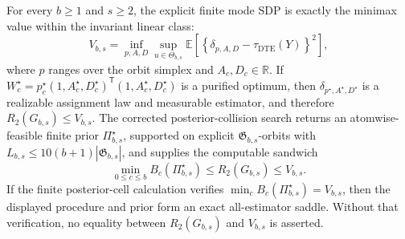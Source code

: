 For every \(b\ge1\) and \(s\ge2\), the explicit finite mode SDP is exactly the minimax value within the invariant linear class:
\[
V_{b,s}=
\inf_{p,A,D}\sup_{u\in\Theta_{b,s}}
\mathbb E\!\left[\left\{\delta_{p,A,D}-\tau_{\mathrm{DTE}}(Y)\right\}^2\right],
\]
where \(p\) ranges over the orbit simplex and \(A_c,D_c\in\mathbb R\). If \(W_c^{\star}=p_c^{\star}(1,A_c^{\star},D_c^{\star})^{\mathsf T}(1,A_c^{\star},D_c^{\star})\) is a purified optimum, then \(\delta_{p^{\star},A^{\star},D^{\star}}\) is a realizable assignment law and measurable estimator, and therefore \(R_2(G_{b,s})\le V_{b,s}\). The corrected posterior-collision search returns an atomwise-feasible finite prior \(\Pi_{b,s}^{\star}\), supported on explicit \(\mathfrak G_{b,s}\)-orbits with \(L_{b,s}\le10(b+1)|\mathfrak G_{b,s}|\), and supplies the computable sandwich
\[
\min_{0\le c\le b}B_c(\Pi_{b,s}^{\star})
\le R_2(G_{b,s})\le V_{b,s}.
\]
If the finite posterior-cell calculation verifies \(\min_cB_c(\Pi_{b,s}^{\star})=V_{b,s}\), then the displayed procedure and prior form an exact all-estimator saddle. Without that verification, no equality between \(R_2(G_{b,s})\) and \(V_{b,s}\) is asserted.